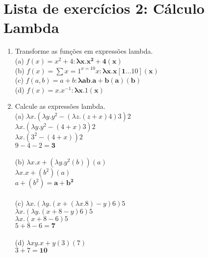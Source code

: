 \documentclass{article}
\begin{document}
\section*{Lista de exercícios 2: Cálculo Lambda}
\begin{enumerate}
    \item Transforme as funções em expressões lambda. \\
    (a) $f(x)=x^{2}+4 : \mathbf{\lambda x.x^{2}+4 (x)}$ \\
    (b) $f(x)=\sum{x=1}^{x=10}x : \mathbf{\lambda x.x[1...10] (x)}$ \\
    (c) $f(a, b)=a+b : \mathbf{\lambda ab.a+b (a)(b)}$ \\
    (d) $f(x) = x.x^{-1} : \mathbf{\lambda x.1 (x)}$ \\
    
    \item Calcule as expressões lambda. \\
    (a) $\lambda x.(\lambda y.y^{2} - (\lambda z.(z+x)4)3)2$ \\
        $\lambda x.(\lambda y.y^{2} - (4+x)3)2$ \\
        $\lambda x.(3^{2} - (4+x))2$ \\
        $9 - 4 - 2 = \mathbf{3}$ \\ \\
    (b) $\lambda x.x + (\lambda y.y^{2}(b))(a)$ \\
        $\lambda x.x + (b^{2})(a)$ \\
        $a + (b^{2}) = \mathbf{a+b^{2}}$ \\ \\
    (c) $\lambda x.(\lambda y.(x+(\lambda x.8)-y)6)5$ \\
        $\lambda x.(\lambda y.(x+8-y)6)5$ \\
        $\lambda x.(x+8-6)5$ \\
        $5+8-6 = \mathbf{7}$ \\ \\
    (d) $\lambda xy.x+y (3)(7)$ \\
        $3+7 = \mathbf{10}$
    

\end{enumerate}
\end{document}
